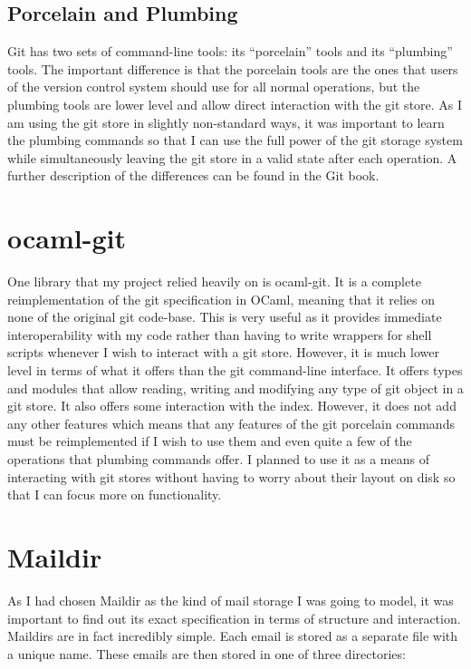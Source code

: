 \subsection{Porcelain and Plumbing}

Git has two sets of command-line tools: its ``porcelain'' tools and its ``plumbing'' tools. The important difference is that the porcelain tools are the ones that users of the version control system should use for all normal operations, but the plumbing tools are lower level and allow direct interaction with the git store. As I am using the git store in slightly non-standard ways, it was important to learn the plumbing commands so that I can use the full power of the git storage system while simultaneously leaving the git store in a valid state after each operation. A further description of the differences can be found in the Git book\cite{chacon2014git}.

\section{ocaml-git}

One library that my project relied heavily on is ocaml-git\cite{code_ocaml-git}. It is a complete reimplementation of the git specification in OCaml, meaning that it relies on none of the original git code-base. This is very useful as it provides immediate interoperability with my code rather than having to write wrappers for shell scripts whenever I wish to interact with a git store. However, it is much lower level in terms of what it offers than the git command-line interface. It offers types and modules that allow reading, writing and modifying any type of git object in a git store. It also offers some interaction with the index. However, it does not add any other features which means that any features of the git porcelain commands must be reimplemented if I wish to use them and even quite a few of the operations that plumbing commands offer. I planned to use it as a means of interacting with git stores without having to worry about their layout on disk so that I can focus more on functionality.

\section{Maildir}

As I had chosen Maildir as the kind of mail storage I was going to model, it was important to find out its exact specification in terms of structure and interaction. Maildirs are in fact incredibly simple. Each email is stored as a separate file with a unique name. These emails are then stored in one of three directories:

